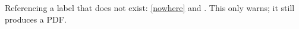 \documentclass{article}
\begin{document}
Referencing a label that does not exist: \ref{nowhere} and \cite{nobody}.
This only warns; it still produces a PDF.
\end{document}
